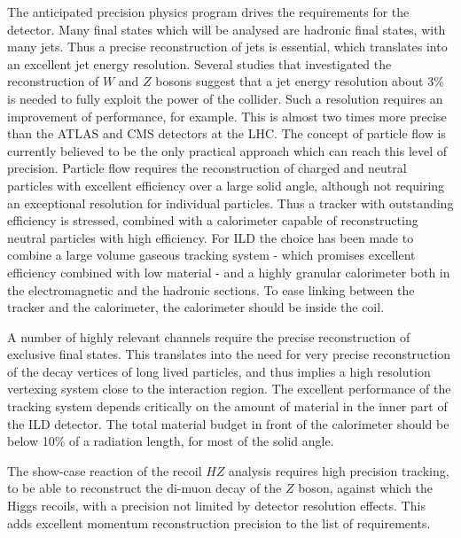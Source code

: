 \documentclass[%
 amsmath,amssymb,
 aps,
 longbibliography,
]{revtex4-1}
\begin{document}

The anticipated precision physics program drives the requirements for the detector. Many final states which will be analysed are hadronic final states, with many jets. Thus a precise reconstruction of jets is essential, which translates into an excellent jet energy resolution. Several studies that investigated the reconstruction of $W$ and $Z$ bosons suggest that a jet energy resolution about 3\% is needed to fully exploit the power of the collider. Such a resolution requires an improvement of performance, for example. This is almost two times more precise than the ATLAS and CMS detectors at the LHC. The concept of particle flow is currently believed to be the only practical approach which can reach this level of precision. Particle flow requires the reconstruction of charged and neutral particles with excellent efficiency over a large solid angle, although not requiring an exceptional  resolution for individual particles. Thus a tracker with outstanding efficiency is stressed, combined with a calorimeter capable of reconstructing neutral particles with high efficiency. For ILD the choice has been made to combine a large volume gaseous tracking system - which promises excellent efficiency combined with low material - and a highly granular calorimeter both in the electromagnetic and the hadronic sections. To ease linking between the tracker and the calorimeter, the calorimeter should be inside the coil. 

A number of highly relevant channels require the precise reconstruction of exclusive final states. This translates into the need for very precise reconstruction of the decay vertices of long lived particles, and thus implies a high resolution vertexing system close to the interaction region. 
The excellent performance of the tracking system depends critically on the amount of material in the inner part of the ILD detector. The total material budget in front of the calorimeter should be below 10\% of a radiation length, for most of the solid angle.


The show-case reaction of the recoil $HZ$ analysis requires high precision tracking, to be able to reconstruct the di-muon decay of the $Z$ boson, against which the Higgs recoils, with a precision not limited by detector resolution effects. This adds excellent momentum reconstruction precision to the list of requirements. 
\end{document}

